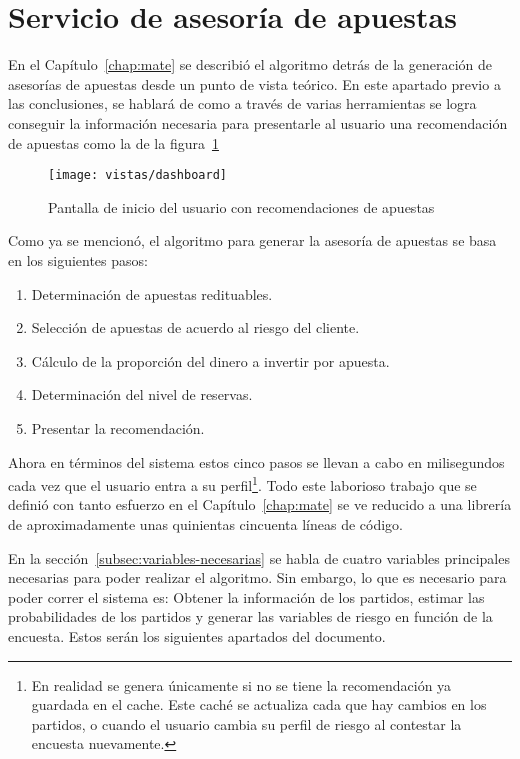 \section{Servicio de asesoría de apuestas}
\graphicspath{{/Users/brunomedina/Dropbox/Tesis-Egobets/egobets-notas/resources/}}
\label{sec:service}

En el Capítulo~\ref{chap:mate} se describió el algoritmo detrás de la generación de asesorías de apuestas desde un punto de vista teórico. En este apartado previo a las conclusiones, se hablará de como a través de varias herramientas se logra conseguir la información necesaria para presentarle al usuario una recomendación de apuestas como la de la figura~\ref{fig:dashboard}

				\begin{figure}[!htb]\centering
				   \begin {minipage}{0.9\textwidth}
				     \texttt{[image: vistas/dashboard]}
				     \caption{Pantalla de inicio del usuario con recomendaciones de apuestas}\label{fig:dashboard}
				   \end{minipage}
				\end{figure}
				
Como ya se mencionó, el algoritmo para generar la asesoría de apuestas se basa en los siguientes pasos:
 \begin{enumerate}
 	\item Determinación de apuestas redituables.
 	\item Selección de apuestas de acuerdo al riesgo del cliente.
 	\item Cálculo de la proporción del dinero a invertir por apuesta.
 	\item Determinación del nivel de reservas.
 	\item Presentar la recomendación.
 \end{enumerate}

Ahora en términos del sistema estos cinco pasos se llevan a cabo en milisegundos cada vez que el usuario entra a su perfil\footnote{En realidad se genera únicamente si no se tiene la recomendación ya guardada en el cache. Este caché se actualiza cada que hay cambios en los partidos, o cuando el usuario cambia su perfil de riesgo al contestar la encuesta nuevamente.}. Todo este laborioso trabajo que se definió con tanto esfuerzo en el Capítulo~\ref{chap:mate} se ve reducido a una librería de aproximadamente unas quinientas cincuenta líneas de código.

En la sección~\ref{subsec:variables-necesarias} se habla de cuatro variables principales necesarias para poder realizar el algoritmo. Sin embargo, lo que es necesario para poder correr el sistema es: Obtener la información de los partidos, estimar las probabilidades de los partidos y generar las variables de riesgo en función de la encuesta. Estos serán los siguientes apartados del documento.


